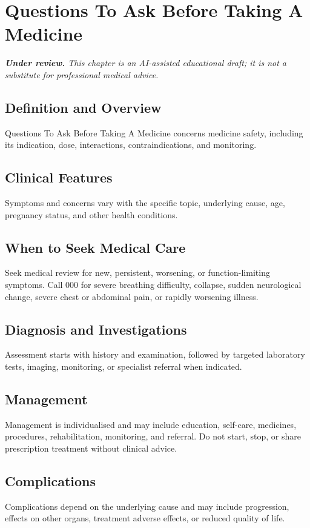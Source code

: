 \chapter{Questions To Ask Before Taking A Medicine}

\medskip
\noindent\textit{\textbf{Under review.} This chapter is an AI-assisted educational draft; it is not a substitute for professional medical advice.}

\section*{Definition and Overview}
Questions To Ask Before Taking A Medicine concerns medicine safety, including its indication, dose, interactions, contraindications, and monitoring.

\section*{Clinical Features}
Symptoms and concerns vary with the specific topic, underlying cause, age, pregnancy status, and other health conditions.

\section*{When to Seek Medical Care}
Seek medical review for new, persistent, worsening, or function-limiting symptoms. Call 000 for severe breathing difficulty, collapse, sudden neurological change, severe chest or abdominal pain, or rapidly worsening illness.

\section*{Diagnosis and Investigations}
Assessment starts with history and examination, followed by targeted laboratory tests, imaging, monitoring, or specialist referral when indicated.

\section*{Management}
Management is individualised and may include education, self-care, medicines, procedures, rehabilitation, monitoring, and referral. Do not start, stop, or share prescription treatment without clinical advice.

\section*{Complications}
Complications depend on the underlying cause and may include progression, effects on other organs, treatment adverse effects, or reduced quality of life.

